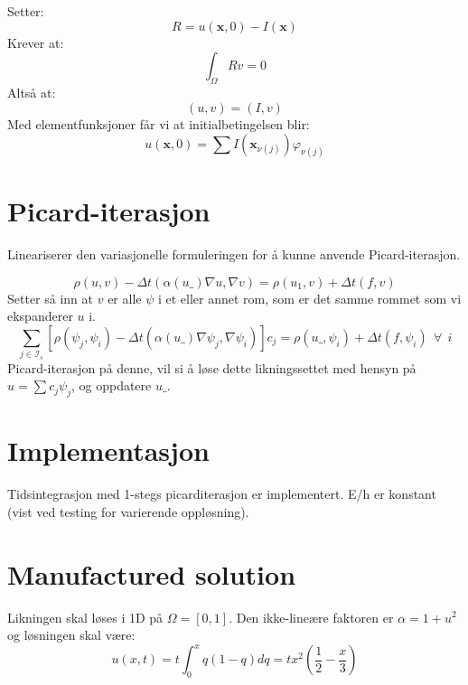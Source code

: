 \documentclass[a4paper, 10pt]{article}
\newcommand{\mb}{\mathbf}
\newcommand{\mc}{\mathcal}
\begin{document}
Setter:
\begin{equation}
	R = u(\mb{x}, 0)-I(\mb{x})
\end{equation}
Krever at:
\begin{equation}
	\int_{\Omega} Rv = 0
\end{equation}
Altså at:
\begin{equation}
	(u, v) = (I, v)
\end{equation}
Med elementfunksjoner får vi at initialbetingelsen blir:
\begin{equation}
	u(\mb{x}, 0) = \sum I(\mb{x}_{\nu(j)}) \varphi_{\nu(j)}
\end{equation}

\section{Picard-iterasjon}
Lineariserer den variasjonelle formuleringen for å kunne anvende Picard-iterasjon.

\begin{equation}
	\rho(u, v) - \Delta t (\alpha(u\_)\nabla u, \nabla v) = \rho(u_1,v) + \Delta t (f, v)
\end{equation}
Setter så inn at $v$ er alle $\psi$ i et eller annet rom, som er det samme rommet som vi ekspanderer $u$ i. 
\begin{equation}
\sum_{j \in \mc{I}_s} \left[\rho(\psi_j, \psi_i) - \Delta t (\alpha(u\_)\nabla\psi_j, \nabla\psi_i) \right]c_j	
= \rho(u\_, \psi_i)+  \Delta t (f, \psi_i) \ \ \forall \ \ i
\end{equation}
Picard-iterasjon på denne, vil si å løse dette likningssettet med hensyn på $u = \sum c_j \psi_j$, og oppdatere $u\_$. 

\section{Implementasjon}
Tidsintegrasjon med 1-stegs picarditerasjon er implementert. E/h er konstant (vist ved testing for varierende oppløsning).

\section{Manufactured solution}
Likningen skal løses i 1D på $\Omega = [0, 1]$. Den ikke-lineære faktoren er $\alpha = 1 + u^2$ og løsningen skal være:
\begin{equation}
	u(x,t) = t\int_0^x q(1-q)dq = tx^2\left(\frac{1}{2} - \frac{x}{3}\right)
\end{equation}
\end{document}
